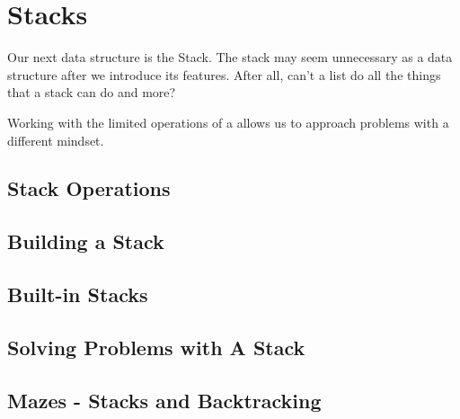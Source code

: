 \chapter{Stacks}
Our next data structure is the Stack.
The stack may seem unnecessary as a data structure after we introduce its features.  
After all, can't a list do all the things that a stack can do and more? 

Working with the limited operations of a allows us to approach problems with a different mindset.

\section{Stack Operations}


\section{Building a Stack}


	



\section{Built-in Stacks}

\section{Solving Problems with A Stack}


\section{Mazes - Stacks and Backtracking}




